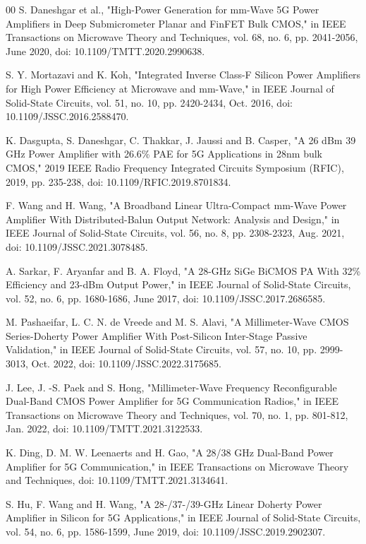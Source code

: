 \documentclass{IEEEtran}
\begin{document}
\begin{thebibliography}{00}
S. Daneshgar et al., "High-Power Generation for mm-Wave 5G Power Amplifiers in Deep Submicrometer Planar and FinFET Bulk CMOS," in IEEE Transactions on Microwave Theory and Techniques, vol. 68, no. 6, pp. 2041-2056, June 2020, doi: 10.1109/TMTT.2020.2990638.

S. Y. Mortazavi and K. Koh, "Integrated Inverse Class-F Silicon Power Amplifiers for High Power Efficiency at Microwave and mm-Wave," in IEEE Journal of Solid-State Circuits, vol. 51, no. 10, pp. 2420-2434, Oct. 2016, doi: 10.1109/JSSC.2016.2588470.


K. Dasgupta, S. Daneshgar, C. Thakkar, J. Jaussi and B. Casper, "A 26 dBm 39 GHz Power Amplifier with 26.6\% PAE for 5G Applications in 28nm bulk CMOS," 2019 IEEE Radio Frequency Integrated Circuits Symposium (RFIC), 2019, pp. 235-238, doi: 10.1109/RFIC.2019.8701834.


F. Wang and H. Wang, "A Broadband Linear Ultra-Compact mm-Wave Power Amplifier With Distributed-Balun Output Network: Analysis and Design," in IEEE Journal of Solid-State Circuits, vol. 56, no. 8, pp. 2308-2323, Aug. 2021, doi: 10.1109/JSSC.2021.3078485.

A. Sarkar, F. Aryanfar and B. A. Floyd, "A 28-GHz SiGe BiCMOS PA With 32\% Efficiency and 23-dBm Output Power," in IEEE Journal of Solid-State Circuits, vol. 52, no. 6, pp. 1680-1686, June 2017, doi: 10.1109/JSSC.2017.2686585.

M. Pashaeifar, L. C. N. de Vreede and M. S. Alavi, "A Millimeter-Wave CMOS Series-Doherty Power Amplifier With Post-Silicon Inter-Stage Passive Validation," in IEEE Journal of Solid-State Circuits, vol. 57, no. 10, pp. 2999-3013, Oct. 2022, doi: 10.1109/JSSC.2022.3175685.

J. Lee, J. -S. Paek and S. Hong, "Millimeter-Wave Frequency Reconfigurable Dual-Band CMOS Power Amplifier for 5G Communication Radios," in IEEE Transactions on Microwave Theory and Techniques, vol. 70, no. 1, pp. 801-812, Jan. 2022, doi: 10.1109/TMTT.2021.3122533.

K. Ding, D. M. W. Leenaerts and H. Gao, "A 28/38 GHz Dual-Band Power Amplifier for 5G Communication," in IEEE Transactions on Microwave Theory and Techniques, doi: 10.1109/TMTT.2021.3134641.


S. Hu, F. Wang and H. Wang, "A 28-/37-/39-GHz Linear Doherty Power Amplifier in Silicon for 5G Applications," in IEEE Journal of Solid-State Circuits, vol. 54, no. 6, pp. 1586-1599, June 2019, doi: 10.1109/JSSC.2019.2902307.


\end{thebibliography}
\end{document}
